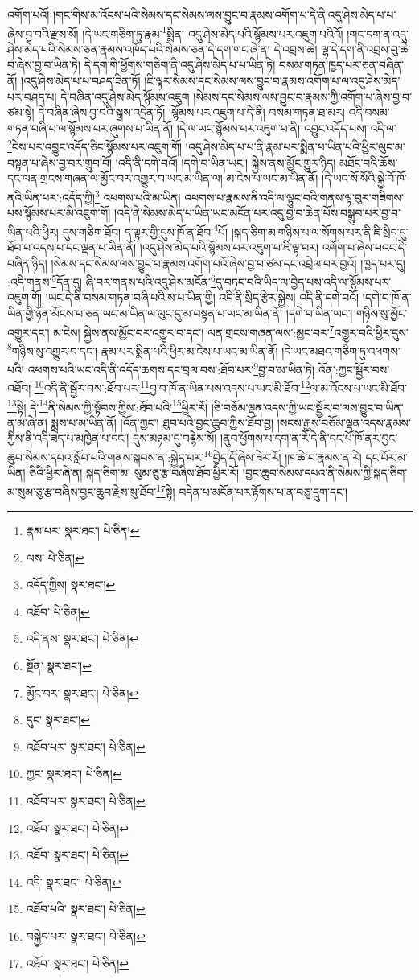 འགོག་པའོ། །གང་གིས་མ་འོངས་པའི་སེམས་དང་སེམས་ལས་བྱུང་བ་རྣམས་འགོག་པ་དེ་ནི་འདུ་ཤེས་མེད་པ་པ་ཞེས་བྱ་བའི་རྫས་སོ། །དེ་ཡང་གཅིག་ཏུ་རྣམ་\footnote{རྣམ་པར་  སྣར་ཐང་།  པེ་ཅིན། }སྨིན། འདུ་ཤེས་མེད་པའི་སྙོམས་པར་འཇུག་པའིའོ། །གང་དག་ན་འདུ་ཤེས་མེད་པའི་སེམས་ཅན་རྣམས་འཁོད་པའི་སེམས་ཅན་དེ་དག་གང་ཞེ་ན། དེ་འབྲས་ཆེ། ལྷ་དེ་དག་ནི་འབྲས་བུ་ཆེ་བ་ཞེས་བྱ་བ་ཡིན་ཏེ། དེ་དག་གི་ཕྱོགས་གཅིག་ནི་འདུ་ཤེས་མེད་པ་པ་ཡིན་ཏེ། བསམ་གཏན་ཁྱད་པར་ཅན་བཞིན་ནོ། །འདུ་ཤེས་མེད་པ་པ་བཤད་ཟིན་ཏོ། །ཇི་ལྟར་སེམས་དང་སེམས་ལས་བྱུང་བ་རྣམས་འགོག་པ་ལ་འདུ་ཤེས་མེད་པར་བཤད་པ། དེ་བཞིན་འདུ་ཤེས་མེད་སྙོམས་འཇུག །སེམས་དང་སེམས་ལས་བྱུང་བ་རྣམས་ཀྱི་འགོག་པ་ཞེས་བྱ་བ་ཙམ་སྟེ། དེ་བཞིན་ཞེས་བྱ་བའི་སྒྲས་འདྲེན་ཏོ། །སྙོམས་པར་འཇུག་པ་དེ་ནི། བསམ་གཏན་ཐ་མར། འདི་བསམ་གཏན་བཞི་པ་ལ་སྙོམས་པར་ཞུགས་པ་ཡིན་ནོ། །དེ་ལ་ཡང་སྙོམས་པར་འཇུག་པ་ནི། འབྱུང་འདོད་པས། འདི་ལ་\footnote{ལས་  པེ་ཅིན། }ངེས་པར་འབྱུང་འདོད་ཅིང་སྙོམས་པར་འཇུག་གོ། །འདུ་ཤེས་མེད་པ་པ་ནི་རྣམ་པར་སྨིན་པ་ཡིན་པའི་ཕྱིར་ལུང་མ་བསྟན་པ་ཞེས་བྱ་བར་གྲུབ་བོ། །འདི་ནི་དགེ་བའོ། །དགེ་བ་ཡིན་ཡང་། སྐྱེས་ནས་མྱོང་གྱུར་ཉིད། མཐོང་བའི་ཆོས་དང་ལན་གྲངས་གཞན་ལ་མྱོང་བར་འགྱུར་བ་ཡང་མ་ཡིན་ལ། མ་ངེས་པ་ཡང་མ་ཡིན་ནོ། །དེ་ཡང་སོ་སོའི་སྐྱེ་བོ་ཁོ་ནའི་ཡིན་པར་:འདོད་ཀྱི།\footnote{འདོད་ཀྱིས།  སྣར་ཐང་། } འཕགས་པའི་མ་ཡིན། འཕགས་པ་རྣམས་ནི་འདི་ལ་ལྟུང་བའི་གནས་ལྟ་བུར་གཟིགས་པས་སྙོམས་པར་མི་འཇུག་གོ། །འདི་ནི་སེམས་མེད་པ་ཡིན་ཡང་མངོན་པར་འདུ་བྱ་བ་ཆེན་པོས་བསྒྲུབ་པར་བྱ་བ་ཡིན་པའི་ཕྱིར། དུས་གཅིག་ཐོབ། ད་ལྟར་གྱི་དུས་ཁོ་ན་ཐོབ་\footnote{འཐོབ་  པེ་ཅིན། }པོ། །སྐད་ཅིག་མ་གཉིས་པ་ལ་སོགས་པར་ནི་ཇི་སྲིད་དུ་ཐོབ་པ་འདས་པ་དང་ལྡན་པ་ཡིན་ནོ། །འདུ་ཤེས་མེད་པའི་སྙོམས་པར་འཇུག་པ་ཇི་ལྟ་བར། འགོག་པ་ཞེས་པའང་དེ་བཞིན་ཉིད། །སེམས་དང་སེམས་ལས་བྱུང་བ་རྣམས་འགོག་པའོ་ཞེས་བྱ་བ་ཙམ་དང་འབྲེལ་བར་བྱའོ། །ཁྱད་པར་དུ། :འདི་གནས་\footnote{འདི་ནས་  སྣར་ཐང་།  པེ་ཅིན། }དོན་དུ། ཞི་བར་གནས་པའི་འདུ་ཤེས་མངོན་\footnote{སྔོན་  སྣར་ཐང་། }དུ་བཏང་བའི་ཡིད་ལ་བྱེད་པས་འདི་ལ་སྙོམས་པར་འཇུག་གོ། །ཡང་དེ་ནི་བསམ་གཏན་བཞི་པའི་ས་པ་ཡིན་གྱི། འདི་ནི་སྲིད་རྩེར་སྐྱེས། འདི་ནི་དགེ་བའོ། །དགེ་བ་ཁོ་ན་ཡིན་གྱི་ཉོན་མོངས་པ་ཅན་ཡང་མ་ཡིན་ལ་ལུང་དུ་མ་བསྟན་པ་ཡང་མ་ཡིན་ནོ། །དགེ་བ་ཡིན་ཡང་། གཉིས་སུ་མྱོང་འགྱུར་དང་། མ་ངེས། སྐྱེས་ནས་མྱོང་བར་འགྱུར་བ་དང་། ལན་གྲངས་གཞན་ལས་:མྱང་བར་\footnote{མྱོང་བར་  སྣར་ཐང་།  པེ་ཅིན། }འགྱུར་བའི་ཕྱིར་དུས་\footnote{དུང་  སྣར་ཐང་། }གཉིས་སུ་འགྱུར་བ་དང་། རྣམ་པར་སྨིན་པའི་ཕྱིར་མ་ངེས་པ་ཡང་མ་ཡིན་ནོ། །དེ་ཡང་མཐའ་གཅིག་ཏུ་འཕགས་པའི། འཕགས་པའི་ཡང་འདི་ནི་འདོད་ཆགས་དང་བྲལ་བས་:ཐོབ་པར་\footnote{འཐོབ་པར་  སྣར་ཐང་།  པེ་ཅིན། }བྱ་བ་མ་ཡིན་ཏེ། འོན་:ཀྱང་སྦྱོར་བས་འཐོབ། \footnote{ཀྱང་  སྣར་ཐང་།  པེ་ཅིན། }འདི་ནི་སྦྱོར་བས་:ཐོབ་པར་\footnote{འཐོབ་པར་  སྣར་ཐང་།  པེ་ཅིན། }བྱ་བ་ཁོ་ན་ཡིན་པས་འདས་པ་ཡང་མི་ཐོབ་\footnote{འཐོབ་  སྣར་ཐང་།  པེ་ཅིན། }ལ་མ་འོངས་པ་ཡང་མི་ཐོབ་\footnote{འཐོབ་  སྣར་ཐང་།  པེ་ཅིན། }སྟེ། དེ་\footnote{འདི་  སྣར་ཐང་།  པེ་ཅིན། }ནི་སེམས་ཀྱི་སྟོབས་ཀྱིས་:ཐོབ་པའི་\footnote{འཐོབ་པའི་  སྣར་ཐང་།  པེ་ཅིན། }ཕྱིར་རོ། །ཅི་བཅོམ་ལྡན་འདས་ཀྱི་ཡང་སྦྱོར་བ་ལས་བྱུང་བ་ཡིན་ན་མ་ཞེ་ན། སྨྲས་པ་མ་ཡིན་ནོ། །འོན་ཀྱང་། ཐུབ་པའི་བྱང་ཆུབ་ཀྱིས་ཐོབ་བྱ། །སངས་རྒྱས་བཅོམ་ལྡན་འདས་རྣམས་ཀྱིས་ནི་འདི་ཟད་པ་མཁྱེན་པ་དང་། དུས་མཉམ་དུ་བརྙེས་སོ། །ནུབ་ཕྱོགས་པ་དག་ན་རེ་དེ་ནི་དང་པོ་ཁོ་ནར་བྱང་ཆུབ་སེམས་དཔའ་སློབ་པའི་གནས་སྐབས་ན་:སྐྱེད་པར་\footnote{བསྐྱེད་པར་  སྣར་ཐང་།  པེ་ཅིན། }བྱེད་དོ་ཞེས་ཟེར་རོ། །ཁ་ཆེ་བ་རྣམས་ན་རེ། དང་པོར་མ་ཡིན། ཅིའི་ཕྱིར་ཞེ་ན། སྐད་ཅིག་མ། སུམ་ཅུ་རྩ་བཞིས་ཐོབ་ཕྱིར་རོ། །བྱང་ཆུབ་སེམས་དཔའ་ནི་སེམས་ཀྱི་སྐད་ཅིག་མ་སུམ་ཅུ་རྩ་བཞིས་བྱང་ཆུབ་རྗེས་སུ་ཐོབ་\footnote{འཐོབ་  སྣར་ཐང་།  པེ་ཅིན། }སྟེ། བདེན་པ་མངོན་པར་རྟོགས་པ་ན་བཅུ་དྲུག་དང་། 